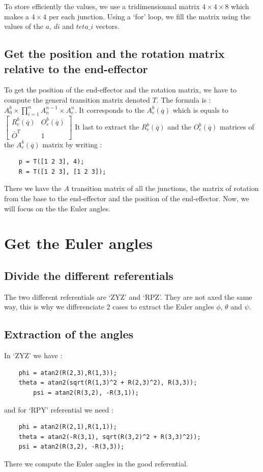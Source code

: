 \documentclass[english,a4paper,11pt]{report}
\begin{document}
	To store efficiently the values, we use a tridimensionnal matrix $4\times4\times8$ which makes a $4\times4$ per each junction. Using a \lq{}for\rq{} loop, we fill the matrix using the values of the $a$, $di$ and $teta\_i$ vectors.
	
	\subsection{Get the position and the rotation matrix relative to the end-effector}
	
	To get the position of the end-effector and the rotation matrix, we have to compute the general transition matrix denoted $T$. The formula is : $A^b_0\times\prod_{i=1}^n A^{n-1}_n\times A^n_e$.
	It corresponds to the $A^b_e(\overline{q})$ which is equals to 
	$\begin{bmatrix} 
	R^b_e(\overline{q}) & O^b_e(\overline{q})\\
	\overline{O}^T & 1
	\end{bmatrix} $
	It last to extract the $R^b_e(\overline{q})$ and the $O^b_e(\overline{q})$ matrices of the $A^b_e(\overline{q})$ matrix by writing :
	\begin{lstlisting}
	p = T([1 2 3], 4);
	R = T([1 2 3], [1 2 3]);
	 \end{lstlisting}
	 
	 There we have the $A$ transition matrix of all the junctions, the matrix of rotation from the base to the end-effector and the position of the end-effector. Now, we will focus on the the Euler angles.
	 
	 
	 \section{Get the Euler angles}
	\subsection{Divide the different referentials}
		The two different referentials are \lq{}ZYZ\rq{} and \lq{}RPZ\rq{}. They are not axed the same way, this is why we differenciate 2 cases to extract the Euler angles $\phi$, $\theta$ and $\psi$.
		
	\subsection{Extraction of the angles}
	In \lq{}ZYZ\rq{} we have :
	\begin{lstlisting}
	phi = atan2(R(2,3),R(1,3));
	theta = atan2(sqrt(R(1,3)^2 + R(2,3)^2), R(3,3));
        psi = atan2(R(3,2), -R(3,1));
	\end{lstlisting}	
	
	and for \lq{}RPY\rq{} referential we need :
	\begin{lstlisting}
	phi = atan2(R(2,1),R(1,1)); 
	theta = atan2(-R(3,1), sqrt(R(3,2)^2 + R(3,3)^2));
	psi = atan2(R(3,2), -R(3,3));
	\end{lstlisting}
	
	There we compute the Euler angles in the good referential.

	\listoffigures
	
\end{document}

